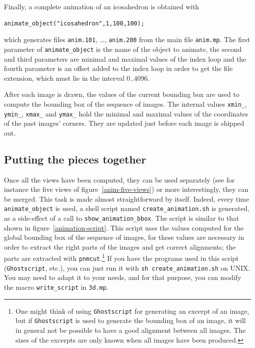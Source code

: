 \documentclass[nonumber,harvardcite]{ltugboat}
\begin{document}
Finally, a complete animation of an icosahedron is obtained
with

\begin{verbatim}
animate_object("icosahedron",1,100,100);
\end{verbatim}

\noindent which generates files \verb|anim.101|, 
\ldots,  \verb|anim.200| from the main file \verb|anim.mp|. 
The first parameter of \verb|animate_object| is the name of the object
to animate, the second and third parameters are minimal and maximal
values of the index loop and the fourth parameter is an offset added
to the index loop in order to get the file extension, which must lie
in the interval $0..4096$.

After each image is drawn, the values of the current bounding box
are used to compute the bounding box of the sequence of images.
The internal values \verb|xmin_|, \verb|ymin_|, \verb|xmax_|
and \verb|ymax_| hold the minimal and maximal values of the coordinates
of the past images' corners. 
They are updated just before each image is shipped out.

\subsection{Putting the pieces together}

Once all the views have been computed, they can be used separately
(see for instance the five views of figure~\ref{anim-five-views})
or more interestingly, they can be merged.
This task is made almost straightforward by \MP{} itself.
Indeed, every time \verb|animate_object| is used, a shell script
named \verb|create_animation.sh|
is generated, as a side-effect of a call to
\verb|show_animation_bbox|. The script is
similar to that shown in figure~\ref{animation-script}. 
This script uses the values 
computed for the global bounding box of the sequence of images,
for these values are necessary in order to extract the right parts
of the images and get correct alignments; the parts are extracted
with \texttt{pnmcut}.\footnote{One might think of using
\texttt{Ghostscript} for generating an excerpt of an image,
but if \texttt{Ghostscript} is used to generate the bounding box
of an image, it will in general not be possible to have a good alignment
between all images. The sizes of the excerpts are only known when all images
have been produced.} 
If you have the programs
used in this script (\texttt{Ghostscript}, etc.), you can just run
it with \verb|sh create_animation.sh| on UNIX. You may need
to adapt it to your needs, and for that purpose, you can modify the macro
\verb|write_script| in \verb|3d.mp|. 
\end{document}
